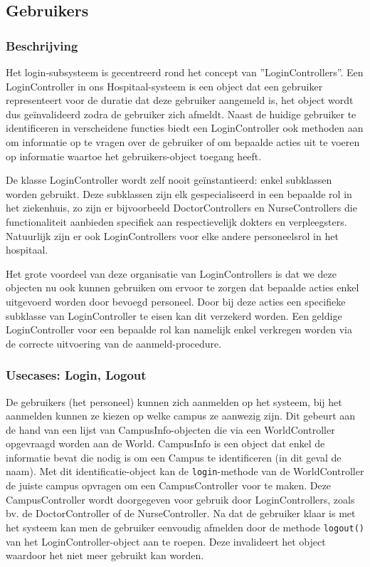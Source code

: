 \documentclass[a4paper]{article}
\begin{document}
\subsection{Gebruikers \label{sec:users}}
\subsubsection{Beschrijving}
Het login-subsysteem is gecentreerd rond het concept van ''LoginControllers''. Een LoginController in ons Hospitaal-systeem is een object dat een gebruiker representeert voor de duratie dat deze gebruiker aangemeld is, het object wordt dus ge\"invalideerd zodra de gebruiker zich afmeldt.
Naast de huidige gebruiker te identificeren in verscheidene functies biedt een LoginController ook methoden aan om informatie op te vragen over de gebruiker of om bepaalde acties uit te voeren op informatie waartoe het gebruikers-object toegang heeft.

De klasse LoginController wordt zelf nooit ge\"instantieerd: enkel subklassen worden gebruikt. Deze subklassen zijn elk gespecialiseerd in een bepaalde rol in het ziekenhuis, zo zijn er bijvoorbeeld DoctorControllers en NurseControllers die functionaliteit aanbieden specifiek aan respectievelijk dokters en verpleegsters. Natuurlijk zijn er ook LoginControllers voor elke andere personeelsrol in het hospitaal.

Het grote voordeel van deze organisatie van LoginControllers is dat we deze objecten nu ook kunnen gebruiken om ervoor te zorgen dat bepaalde acties enkel uitgevoerd worden door bevoegd personeel. Door bij deze acties een specifieke subklasse van LoginController te eisen kan dit verzekerd worden. Een geldige LoginController voor een bepaalde rol kan namelijk enkel verkregen worden via de correcte uitvoering van de aanmeld-procedure.
\subsubsection{Usecases: Login, Logout}
De gebruikers (het personeel) kunnen zich aanmelden op het systeem, bij het aanmelden kunnen ze kiezen op welke campus ze aanwezig zijn. 
Dit gebeurt aan de hand van een lijst van CampusInfo-objecten die via een WorldController opgevraagd worden aan de World. 
CampusInfo is een object dat enkel de informatie bevat die nodig is om een Campus te identificeren (in dit geval de naam).
Met dit identificatie-object kan de \texttt{login}-methode van de WorldController de juiste campus opvragen om een CampusController voor te maken.
Deze CampusController wordt doorgegeven voor gebruik door LoginControllers, zoals bv. de DoctorController of de NurseController.
Na dat de gebruiker klaar is met het systeem kan men de gebruiker eenvoudig afmelden door de methode \texttt{logout()} van het LoginController-object aan te roepen. Deze invalideert het object waardoor het niet meer gebruikt kan worden.
\end{document}
